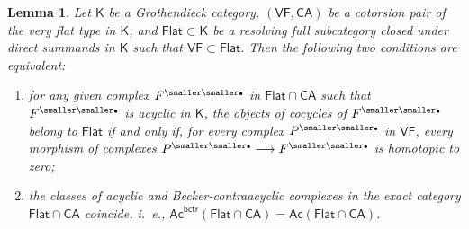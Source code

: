 \documentclass[12pt,a4paper]{amsart}
\newcommand{\+}{\nobreakdash-}
\renewcommand{\:}{\colon}
\newcommand{\rarrow}{\longrightarrow}
\newcommand{\bu}{{\text{\smaller\smaller$\scriptstyle\bullet$}}}
\newcommand{\sK}{\mathsf K}
\newcommand{\VF}{\mathsf{VF}}
\newcommand{\CA}{\mathsf{CA}}
\newcommand{\Flat}{\mathsf{Flat}}
\newcommand{\Ac}{\mathsf{Ac}}
\newcommand{\bctr}{\mathsf{bctr}}
\theoremstyle{plain}
\newtheorem{lem}[thm]{Lemma}
\theoremstyle{definition}
\begin{document}
\begin{lem} \label{ac=ac-bctr-equivalent-conditions}
 Let\/ $\sK$ be a Grothendieck category, $(\VF,\CA)$ be a cotorsion pair
of the very flat type in\/ $\sK$, and\/ $\Flat\subset\sK$ be a resolving
full subcategory closed under direct summands in\/ $\sK$ such that\/
$\VF\subset\Flat$.
 Then the following two conditions are equivalent:
\begin{enumerate}
\item for any given complex $F^\bu$ in\/ $\Flat\cap\CA$ such that
$F^\bu$ is acyclic in\/ $\sK$, the objects of cocycles of $F^\bu$ belong
to\/ $\Flat$ if and only if, for every complex $P^\bu$ in\/ $\VF$,
every morphism of complexes $P^\bu\rarrow F^\bu$ is homotopic to zero;
\item the classes of acyclic and Becker-contraacyclic complexes in
the exact category\/ $\Flat\cap\CA$ coincide, i.~e.,
$\Ac^\bctr(\Flat\cap\CA)=\Ac(\Flat\cap\CA)$.
\end{enumerate}
\end{lem}
\end{document}
